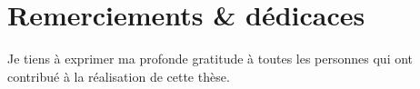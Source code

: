 \chapter*{Remerciements \& dédicaces}

Je tiens à exprimer ma profonde gratitude à toutes les personnes qui ont contribué à la réalisation de cette thèse.